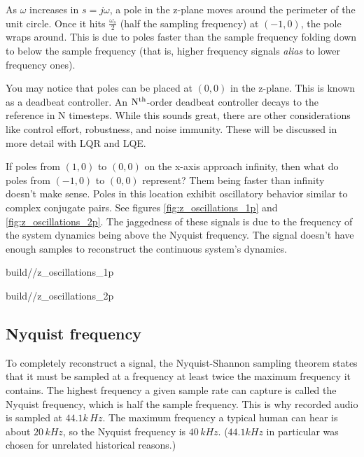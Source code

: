 As $\omega$ increases in $s = j\omega$, a pole in the z-plane moves around the
perimeter of the unit circle. Once it hits $\frac{\omega_s}{2}$ (half the
sampling frequency) at $(-1, 0)$, the pole wraps around. This is due to poles
faster than the sample frequency folding down to below the sample frequency
(that is, higher frequency signals \textit{alias} to lower frequency ones).

You may notice that poles can be placed at $(0, 0)$ in the z-plane. This is
known as a deadbeat controller. An $\rm N^{th}$-order deadbeat controller decays
to the \gls{reference} in N timesteps. While this sounds great, there are other
considerations like \gls{control effort}, \gls{robustness}, and
\gls{noise immunity}. These will be discussed in more detail with LQR and LQE.

If poles from $(1, 0)$ to $(0, 0)$ on the x-axis approach infinity, then what do
poles from $(-1, 0)$ to $(0, 0)$ represent? Them being faster than infinity
doesn't make sense. Poles in this location exhibit oscillatory behavior similar
to complex conjugate pairs. See figures \ref{fig:z_oscillations_1p} and
\ref{fig:z_oscillations_2p}. The jaggedness of these signals is due to the
frequency of the \gls{system} dynamics being above the Nyquist frequency. The
 signal doesn't have enough samples to
reconstruct the continuous \gls{system}'s dynamics.
\begin{bookfigure}
  \begin{minisvg}{2}{build/\chapterpath/z_oscillations_1p}
    \caption{Single poles in various locations in z-plane}
    \label{fig:z_oscillations_1p}
  \end{minisvg}
  \hfill
  \begin{minisvg}{2}{build/\chapterpath/z_oscillations_2p}
    \caption{Complex conjugate poles in various locations in z-plane}
    \label{fig:z_oscillations_2p}
  \end{minisvg}
\end{bookfigure}

\subsection{Nyquist frequency}

To completely reconstruct a signal, the Nyquist-Shannon sampling theorem states
that it must be sampled at a frequency at least twice the maximum frequency it
contains. The highest frequency a given sample rate can capture is called the
Nyquist frequency, which is half the sample frequency. This is why recorded
audio is sampled at $44.1k\,Hz$. The maximum frequency a typical human can hear
is about $20\,kHz$, so the Nyquist frequency is $40\,kHz$. ($44.1kHz$ in
particular was chosen for unrelated historical reasons.)

